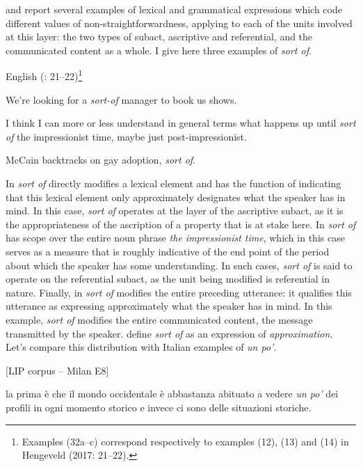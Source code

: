 \citet[1965–1975]{HengeveldKeizer2011} and \citet{Hengeveld2017} report several examples of lexical and grammatical expressions which code different values of non-straightforwardness, applying to each of the units involved at this layer: the two types of subact, ascriptive and referential, and the communicated content as a whole. I give here three examples of \textit{sort of}.

\ea%
    \label{ex:key:82}

          English (\citealt{Hengeveld2017}: 21–22)\footnote{Examples (32a–c) correspond respectively to examples (12), (13) and (14) in Hengeveld (2017: 21–22).}

\ea\label{ex:key:82a}  We’re looking for a \textit{sort-of} manager to book us shows.

\ex\label{ex:key:82b}  I think I can more or less understand in general terms what happens up until \textit{sort of} the impressionist time, maybe just post-impressionist.

\ex\label{ex:key:82c}  McCain backtracks on gay adoption, \textit{sort of}.
    \z
\z

In  \textit{sort of} directly modifies a lexical element and has the function of indicating that this lexical element only approximately designates what the speaker has in mind. In this case, \textit{sort of} operates at the layer of the ascriptive subact, as it is the appropriateness of the ascription of a property that is at stake here. In  \textit{sort of} has scope over the entire noun phrase \textit{the impressionist time}, which in this case serves as a measure that is roughly indicative of the end point of the period about which the speaker has some understanding. In such cases, \textit{sort of} is said to operate on the referential subact, as the unit being modified is referential in nature. Finally, in  \textit{sort of} modifies the entire preceding utterance: it qualifies this utterance as expressing approximately what the speaker has in mind. In this example, \textit{sort of} modifies the entire communicated content, the message transmitted by the speaker. \citet{HengeveldKeizer2011} define \textit{sort of} as an expression of \textit{approximation.} Let’s compare this distribution with Italian examples of \textit{un po’}.

\ea%
    \label{ex:key:83}

          [LIP corpus – Milan E8]

la prima è che il mondo occidentale è abbastanza abituato a vedere \textit{un po’} dei profili in ogni momento storico e invece ci sono delle situazioni storiche.

